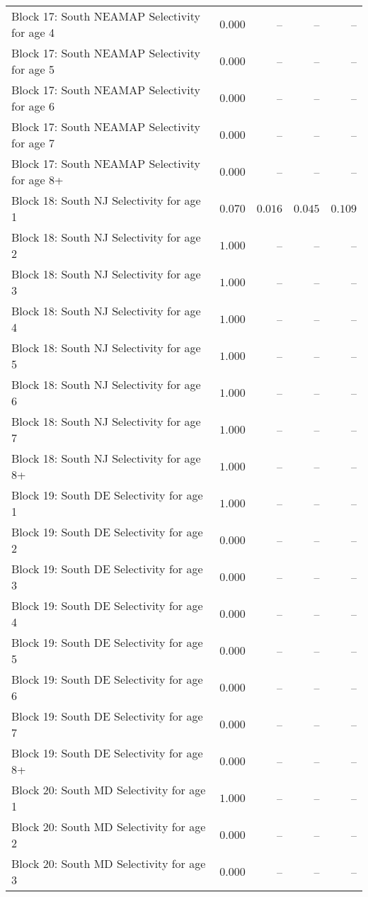 \documentclass[
]{article}
\begin{document}
\begin{landscape}
\begin{longtable}[t]{lrrrr}
Block 17: South NEAMAP Selectivity for age 4 & $0.000$ & -- & -- & --\\
Block 17: South NEAMAP Selectivity for age 5 & $0.000$ & -- & -- & --\\
Block 17: South NEAMAP Selectivity for age 6 & $0.000$ & -- & -- & --\\
\addlinespace
Block 17: South NEAMAP Selectivity for age 7 & $0.000$ & -- & -- & --\\
Block 17: South NEAMAP Selectivity for age 8+ & $0.000$ & -- & -- & --\\
Block 18: South NJ Selectivity for age 1 & $0.070$ & $0.016$ & $0.045$ & $0.109$\\
Block 18: South NJ Selectivity for age 2 & $1.000$ & -- & -- & --\\
Block 18: South NJ Selectivity for age 3 & $1.000$ & -- & -- & --\\
\addlinespace
Block 18: South NJ Selectivity for age 4 & $1.000$ & -- & -- & --\\
Block 18: South NJ Selectivity for age 5 & $1.000$ & -- & -- & --\\
Block 18: South NJ Selectivity for age 6 & $1.000$ & -- & -- & --\\
Block 18: South NJ Selectivity for age 7 & $1.000$ & -- & -- & --\\
Block 18: South NJ Selectivity for age 8+ & $1.000$ & -- & -- & --\\
\addlinespace
Block 19: South DE Selectivity for age 1 & $1.000$ & -- & -- & --\\
Block 19: South DE Selectivity for age 2 & $0.000$ & -- & -- & --\\
Block 19: South DE Selectivity for age 3 & $0.000$ & -- & -- & --\\
Block 19: South DE Selectivity for age 4 & $0.000$ & -- & -- & --\\
Block 19: South DE Selectivity for age 5 & $0.000$ & -- & -- & --\\
\addlinespace
Block 19: South DE Selectivity for age 6 & $0.000$ & -- & -- & --\\
Block 19: South DE Selectivity for age 7 & $0.000$ & -- & -- & --\\
Block 19: South DE Selectivity for age 8+ & $0.000$ & -- & -- & --\\
Block 20: South MD Selectivity for age 1 & $1.000$ & -- & -- & --\\
Block 20: South MD Selectivity for age 2 & $0.000$ & -- & -- & --\\
\addlinespace
Block 20: South MD Selectivity for age 3 & $0.000$ & -- & -- & --\\

\end{longtable}
\end{landscape}
\end{document}
